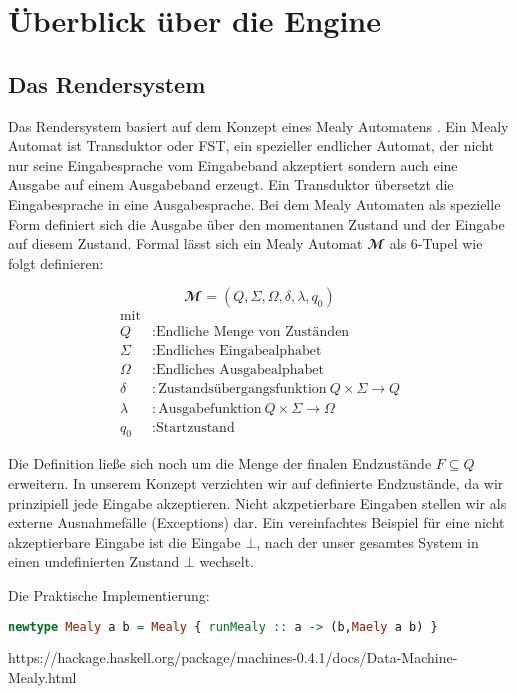 \chapter{Überblick über die Engine}

\section{Das Rendersystem}

Das Rendersystem basiert auf dem Konzept eines Mealy Automatens \cite{Mealy1955}. Ein Mealy Automat ist Transduktor oder \ac{FST}, ein spezieller endlicher Automat, der nicht nur seine Eingabesprache vom Eingabeband akzeptiert sondern auch eine Ausgabe auf einem Ausgabeband erzeugt. Ein Transduktor übersetzt die Eingabesprache in eine Ausgabesprache. Bei dem Mealy Automaten als spezielle Form definiert sich die Ausgabe über den momentanen Zustand und der Eingabe auf diesem Zustand. Formal lässt sich ein Mealy Automat $\mathbfcal{M}$ als 6-Tupel wie folgt definieren:

\[
\mathbfcal{M} = \left( Q, \Sigma, \Omega, \delta, \lambda, q_0 \right)
\]
\begin{align*}
	\text{mit}\\
	Q &: \text{Endliche Menge von Zuständen} \\
	\Sigma  &:\text{Endliches Eingabealphabet} \\
	\Omega  &:\text{Endliches Ausgabealphabet} \\
	\delta  &:\text{Zustandsübergangsfunktion}\ Q \times \Sigma \rightarrow Q \\
	\lambda &:\text{Ausgabefunktion}\ Q \times \Sigma \rightarrow \Omega \\
	q_0 &: \text{Startzustand}
\end{align*}

Die Definition ließe sich noch um die Menge der finalen Endzustände $F \subseteq Q$ erweitern. In unserem Konzept verzichten wir auf definierte Endzustände, da wir prinzipiell jede Eingabe akzeptieren. Nicht akzpetierbare Eingaben stellen wir als externe Ausnahmefälle (Exceptions) dar. Ein vereinfachtes Beispiel für eine nicht akzeptierbare Eingabe ist die Eingabe $\bot$, nach der unser gesamtes System in einen undefinierten Zustand $\bot$ wechselt.

Die Praktische Implementierung:
\begin{lstlisting}[language=Haskell]
newtype Mealy a b = Mealy { runMealy :: a -> (b,Maely a b) }
\end{lstlisting}
https://hackage.haskell.org/package/machines-0.4.1/docs/Data-Machine-Mealy.html


